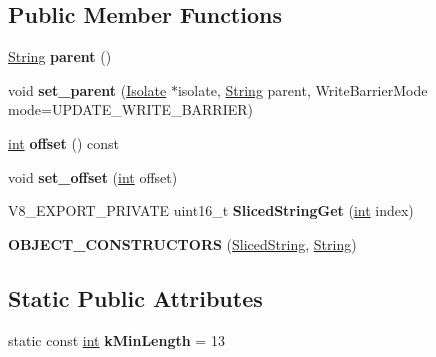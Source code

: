 \subsection*{Public Member Functions}
\begin{DoxyCompactItemize}
\item 
\mbox{\label{classv8_1_1internal_1_1SlicedString_aae4b644710743388675ea56904d9acc1}} 
\mbox{\hyperlink{classv8_1_1internal_1_1String}{String}} {\bfseries parent} ()
\item 
\mbox{\label{classv8_1_1internal_1_1SlicedString_afe2ff52f25e392cec94c248c341f0b6d}} 
void {\bfseries set\+\_\+parent} (\mbox{\hyperlink{classv8_1_1internal_1_1Isolate}{Isolate}} $\ast$isolate, \mbox{\hyperlink{classv8_1_1internal_1_1String}{String}} parent, Write\+Barrier\+Mode mode=U\+P\+D\+A\+T\+E\+\_\+\+W\+R\+I\+T\+E\+\_\+\+B\+A\+R\+R\+I\+ER)
\item 
\mbox{\label{classv8_1_1internal_1_1SlicedString_a5c34c97d86652bce601da3aae64c82b2}} 
\mbox{\hyperlink{classint}{int}} {\bfseries offset} () const
\item 
\mbox{\label{classv8_1_1internal_1_1SlicedString_ac2d7335184687e4095a451e7f0a234d9}} 
void {\bfseries set\+\_\+offset} (\mbox{\hyperlink{classint}{int}} offset)
\item 
\mbox{\label{classv8_1_1internal_1_1SlicedString_a8287c8f2ffdd4bc311b1923d17002717}} 
V8\+\_\+\+E\+X\+P\+O\+R\+T\+\_\+\+P\+R\+I\+V\+A\+TE uint16\+\_\+t {\bfseries Sliced\+String\+Get} (\mbox{\hyperlink{classint}{int}} index)
\item 
\mbox{\label{classv8_1_1internal_1_1SlicedString_a3c110d734affbce9c96049026890df06}} 
{\bfseries O\+B\+J\+E\+C\+T\+\_\+\+C\+O\+N\+S\+T\+R\+U\+C\+T\+O\+RS} (\mbox{\hyperlink{classv8_1_1internal_1_1SlicedString}{Sliced\+String}}, \mbox{\hyperlink{classv8_1_1internal_1_1String}{String}})
\end{DoxyCompactItemize}
\subsection*{Static Public Attributes}
\begin{DoxyCompactItemize}
\item 
\mbox{\label{classv8_1_1internal_1_1SlicedString_a007f254a8f5d3daeb63aa3dbeba7d123}} 
static const \mbox{\hyperlink{classint}{int}} {\bfseries k\+Min\+Length} = 13
\end{DoxyCompactItemize}
